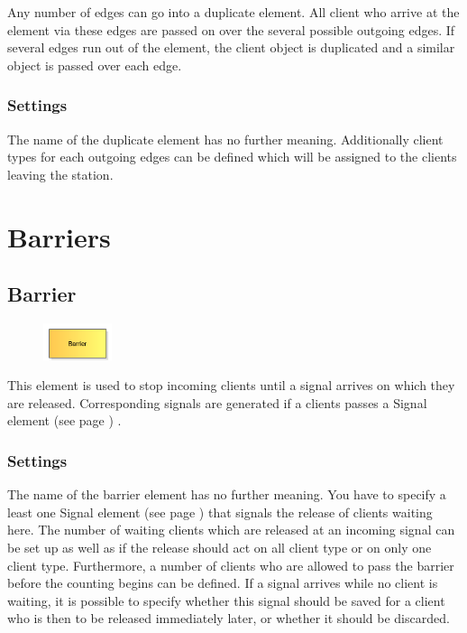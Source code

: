 Any number of edges can go into a duplicate element. All client who arrive at the element via these edges are passed on over
the several possible outgoing edges. If several edges run out of the element, the client object is duplicated and a
similar object is passed over each edge.

\subsection*{Settings}

The name of the duplicate element has no further meaning. Additionally client types for each outgoing edges can be
defined which will be assigned to the clients leaving the station.





\chapter{Barriers}

\section{Barrier}
\label{ref:ModelElementBarrier}

\begin{figure}
\vspace{-22pt}
\includegraphics[width=2cm]{imageModelElementBarrier.png}
\vspace{-22pt}
\end{figure}

This element is used to stop incoming clients until a signal arrives on which they are released.
Corresponding signals are generated if a clients passes a
Signal element (see page \pageref{ref:ModelElementSignal}) .

\subsection*{Settings}

The name of the barrier element has no further meaning. You have to specify a least one
Signal element (see page \pageref{ref:ModelElementSignal}) that signals the release of clients waiting here.
The number of waiting clients which are released at an incoming signal can be set up as well as
if the release should act on all client type or on only one client type.
Furthermore, a number of clients who are allowed to pass the barrier before the counting begins
can be defined. If a signal arrives while no client is waiting, it is possible to specify whether
this signal should be saved for a client who is then to be released immediately later, or whether
it should be discarded.

